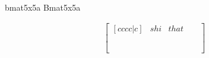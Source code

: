 \begin{align*}

\end{align*}

bmat5x5a
Bmat5x5a

\begin{align*}
  \begin{bmatrix}[cccc|c]
  & shi & that &  &  \\
   &  &  &  &  \\
   &  &  &  &  \\
   &  &  &  &  \\
   &  &  &  &  \\
  \end{bmatrix}
\end{align*}


